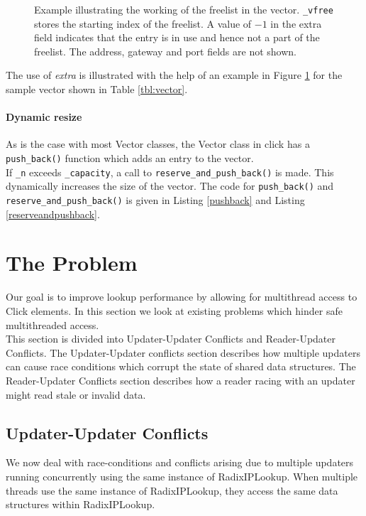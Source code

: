 \documentclass[12pt,a4paper]{article}
\begin{document}
\begin{figure}[tph]
\begin{center}
\begin{tabular}{|p{2.5in}|c|}
\hline
\end{tabular}
\cprotect\caption{Example illustrating the working of the freelist in the vector. \verb+_vfree+ stores the starting index of the freelist. A value of $-1$ in the extra field indicates that the entry is in use and hence not a part of the freelist. The address, gateway and port fields are not shown.}
\end{center}
\label{fig:freelisteg}		
\end{figure}


The use of \emph{extra} is illustrated with the help of an example in Figure \ref{fig:freelisteg} for the sample vector shown in Table \ref{tbl:vector}.\\

\paragraph{Dynamic resize}
As is the case with most Vector classes, the Vector class in click has a \verb+push_back()+ function which adds an entry to the vector.\\
If \verb+_n+ exceeds \verb+_capacity+, a call to \verb+reserve_and_push_back()+ is made. This dynamically increases the size of the vector. The code for \verb+push_back()+ and \verb+reserve_and_push_back()+ is given in Listing \ref{pushback} and Listing \ref{reserveandpushback}.

\section{The Problem}
\label{sec:problem}
Our goal is to improve lookup performance by allowing for multithread access to Click elements. In this section we look at existing problems which hinder safe multithreaded access.\\

This section is divided into Updater-Updater Conflicts and Reader-Updater Conflicts. The Updater-Updater conflicts section describes how multiple updaters can cause race conditions which corrupt the state of shared data structures. The Reader-Updater Conflicts section describes how a reader racing with an updater might read stale or invalid data.
\subsection{Updater-Updater Conflicts}
We now deal with race-conditions and conflicts arising due to multiple updaters running concurrently using the same instance of RadixIPLookup. When multiple threads use the same instance of RadixIPLookup, they access the same data structures within RadixIPLookup.
\end{document}

